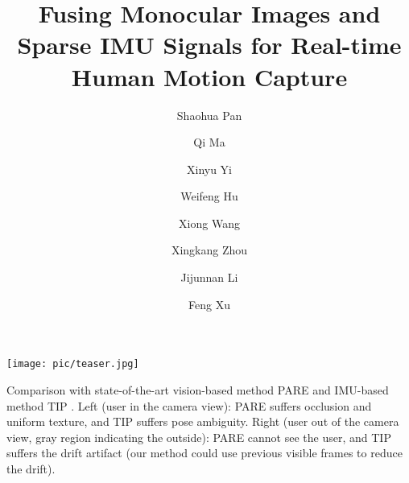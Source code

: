 \documentclass[sigconf,nonacm=true]{acmart}
\begin{document}
\title{Fusing Monocular Images and Sparse IMU Signals for Real-time Human Motion Capture}

\author{Shaohua Pan}

\author{Qi Ma}

\author{Xinyu Yi}

\author{Weifeng Hu}

\author{Xiong Wang}

\author{Xingkang Zhou}

\author{Jijunnan Li}

\author{Feng Xu}

\begin{abstract}
    
\end{abstract}

\begin{teaserfigure}
  \texttt{[image: pic/teaser.jpg]}
  \caption{Comparison with state-of-the-art vision-based method PARE \cite{PARE} and IMU-based method TIP \cite{TIP}. Left (user in the camera view): PARE suffers occlusion and uniform texture, and TIP suffers pose ambiguity. Right (user out of the camera view, gray region indicating the outside): PARE cannot see the user, and TIP suffers the drift artifact (our method could use previous visible frames to reduce the drift). }
  \label{fig:teaser}
\end{teaserfigure}


\maketitle





\end{document}
